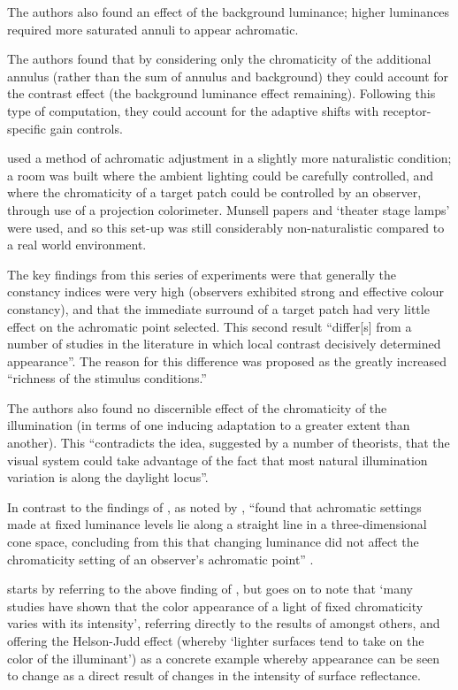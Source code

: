 The authors also found an effect of the background luminance; higher luminances required more saturated annuli to appear achromatic. 

The authors found that by considering only the chromaticity of the additional annulus (rather than the sum of annulus and background) they could account for the contrast effect (the background luminance effect remaining). Following this type of computation, they could account for the adaptive shifts with receptor-specific gain controls.

\textbf{\citet{brainard_color_1998}} used a method of achromatic adjustment in a slightly more naturalistic condition; a room was built where the ambient lighting could be carefully controlled, and where the chromaticity of a target patch could be controlled by an observer, through use of a projection colorimeter. Munsell papers and `theater stage lamps' were used, and so this set-up was still considerably non-naturalistic compared to a real world environment.

The key findings from this series of experiments were that generally the constancy indices were very high (observers exhibited strong and effective colour constancy), and that the immediate surround of a target patch had very little effect on the achromatic point selected. This second result ``differ[s] from a number of studies in the literature in which local contrast decisively determined appearance''. The reason for this difference was proposed as the greatly increased ``richness of the stimulus conditions.''

The authors also found no discernible effect of the chromaticity of the illumination (in terms of one inducing adaptation to a greater extent than another). This ``contradicts the idea, suggested by a number of theorists, that the visual system could take advantage of the fact that most natural illumination variation is along the daylight locus''.

In contrast to the findings of \citet{werner_effect_1982}, as noted by \citet{aston_what_2017}, \citet{brainard_color_1998} ``found that achromatic settings made at fixed luminance levels lie along a straight line in a three-dimensional cone space, concluding from this that changing luminance did not affect the chromaticity setting of an observer’s achromatic point'' \citep{aston_what_2017}.

\textbf{\citet{kuriki_loci_2006}} starts by referring to the above finding of \citet{brainard_color_1998}, but goes on to note that `many studies have shown that the color appearance of a light of fixed chromaticity varies with its intensity', referring directly to the results of \citet{werner_effect_1982} amongst others, and offering the Helson-Judd effect (whereby `lighter surfaces tend to take on the color of the illuminant') as a concrete example whereby appearance can be seen to change as a direct result of changes in the intensity of surface reflectance.

